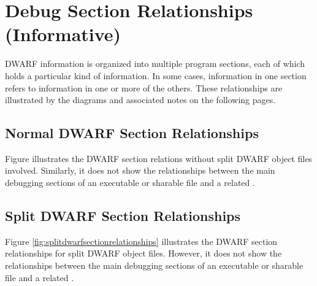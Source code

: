 \chapter{Debug Section Relationships (Informative)}
\label{app:debugsectionrelationshipsinformative}
DWARF information is organized into multiple program sections, 
each of which holds a particular kind of information. In some 
cases, information in one section refers to information in one 
or more of the others. These relationships are illustrated by 
the diagrams and associated notes on the following pages.

\section{Normal DWARF Section Relationships}
Figure  illustrates
the DWARF section relations without split DWARF object files
involved. Similarly, it does not show the 
relationships between the main debugging sections of an executable
or sharable file and a related .

\section{Split DWARF Section Relationships}
Figure \ref{fig:splitdwarfsectionrelationships} illustrates
the DWARF section relationships for split DWARF object files.
However, it does not show the 
relationships between the main debugging sections of an executable
or sharable file and a related .


